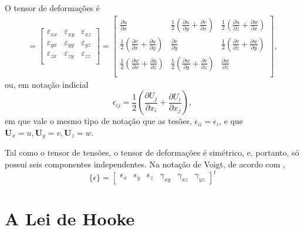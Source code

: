 O tensor de deformações é
\begin{gather}
    [\mathbf{\epsilon}] = 
    \begin{bmatrix}
        \varepsilon_{xx} & \varepsilon_{xy} & \varepsilon_{xz} \\
        \varepsilon_{yx} & \varepsilon_{yy} & \varepsilon_{yz} \\
        \varepsilon_{zx} & \varepsilon_{zy} & \varepsilon_{zz} \\
    \end{bmatrix}
        =
    \begin{bmatrix}
        \frac{\partial u}{\partial x} & \frac{1}{2} \left(\frac{\partial u}{\partial y}+\frac{\partial v}{\partial x}\right) & \frac{1}{2} \left(\frac{\partial u}{\partial z}+\frac{\partial w}{\partial x}\right) \\
        \frac{1}{2} \left(\frac{\partial v}{\partial x}+\frac{\partial u}{\partial y}\right) & \frac{\partial v}{\partial y} & \frac{1}{2} \left(\frac{\partial v}{\partial z}+\frac{\partial w}{\partial y}\right) \\
        \frac{1}{2} \left(\frac{\partial w}{\partial x}+\frac{\partial u}{\partial z}\right) & \frac{1}{2} \left(\frac{\partial w}{\partial y}+\frac{\partial v}{\partial z}\right) & \frac{\partial w}{\partial z} \\
    \end{bmatrix},
    \label{eq:tensor_de_deformacoes}
\end{gather}
ou, em notação indicial
\begin{equation}
    \epsilon_{ij} = \frac{1}{2} \left(\frac{\partial U_j}{\partial x_i} + \frac{\partial U_i}{\partial x_j}\right),
\end{equation}
em que vale o mesmo tipo de notação que as tesões, $\epsilon_{ii} = \epsilon_i$, e que $\bm{U}_x = u, \bm{U}_y = v, \bm{U}_z = w$.

Tal como o tensor de tensões, o tensor de deformações é simétrico, e, portanto, só possui seis componentes independentes. Na notação de Voigt, de acordo com ,
\begin{equation}
    \{\epsilon\} = \begin{bmatrix}
        \epsilon_x & \epsilon_y & \epsilon_z & \gamma_{xy} & \gamma_{xz} & \gamma_{yz}
    \end{bmatrix}^t
\end{equation}

\section{A Lei de Hooke}

